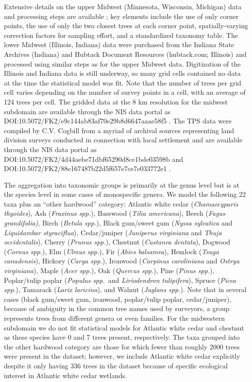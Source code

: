\documentclass[10pt,letterpaper]{article}
\begin{document}
Extensive details on the upper Midwest (Minnesota, Wisconsin, Michigan)
data and processing steps are available \cite{goring2015composition};
key elements include the use of only corner points, the use of only
the two closest trees at each corner point, spatially-varying correction
factors for sampling effort, and a standardized taxonomy table. The
lower Midwest (Illinois, Indiana) data were purchased from the Indiana
State Archives (Indiana) and Hubtack Document Resources (hubtack.com;
Illinois) and processed using similar steps as for the upper Midwest
data. Digitization of the Illinois and Indiana data is still underway,
so many grid cells contained no data at the time the statistical model
was fit. Note that the number of trees per grid cell varies depending
on the number of survey points in a cell, with an average of 124 trees
per cell. The gridded data at the 8 km resolution for the midwest
subdomain are available through the NIS data portal as
DOI:10.5072/FK2/e9c144ab83af70e29b8d6647aaae58f5 \cite{Gori:etal:data:2016}.
The TPS data were compiled by C.V. Cogbill from a myriad of archival
sources representing land division surveys conducted in connection
with local settlement and are available through the
NIS data portal as DOI:10.5072/FK2/4d44aebe71dbf65290d8ce1bde03598b
and DOI:10.5072/FK2/88e167487b22d5f657e7ce7e033772e1 \cite{Cogb:dataNE:2016,Cogb:dataOH:2016}. 

The aggregation into taxonomic groups is primarily at the genus level
but is at the species level in some cases of monospecific genera.
We model the following 22 taxa plus an ``other hardwood'' category:
Atlantic white cedar (\emph{Chamaecyparis thyoides}), Ash (\emph{Fraxinus
spp.}), Basswood (\emph{Tilia americana}), Beech (\emph{Fagus grandifolia)},
Birch (\emph{Betula spp.}), Black gum/sweet gum (\emph{Nyssa sylvatica}
and \emph{Liquidambar styraciflua}), Cedar/juniper (\emph{Juniperus
virginiana} and \emph{Thuja occidentalis}), Cherry (\emph{Prunus spp.}),
Chestnut (\emph{Castanea dentata}), Dogwood (\emph{Cornus spp.}),
Elm (\emph{Ulmus spp.}), Fir (\emph{Abies balsamea}), Hemlock (\emph{Tsuga
canadensis}), Hickory (\emph{Carya spp.}), Ironwood (\emph{Carpinus
caroliniana} and \emph{Ostrya virginiana}), Maple (\emph{Acer spp.}),
Oak (\emph{Quercus spp.}), Pine (\emph{Pinus spp.}), Poplar/tulip
poplar (\emph{Populus spp.}~and \emph{Liriodendron tulipifera}),
Spruce (\emph{Picea spp.}), Tamarack (\emph{Larix laricina}), and
Walnut (\emph{Juglans spp.}). Note that in several cases (black gum/sweet
gum, ironwood, poplar/tulip poplar, cedar/juniper), because of ambiguity
in the common tree names used by surveyors, a group represents trees
from different genera or even families. For the midwestern subdomain
we do not fit statistical models for Atlantic white cedar and chestnut
as these species have 0 and 7 trees present, respectively. The taxa
grouped into the other hardwood category are those for which fewer
than roughly 2000 trees were present in the dataset; however, we include
Atlantic white cedar explicitly despite it only having 336 trees in
the dataset because of specific ecological interest in Atlantic white
cedar wetlands. 
\end{document}

